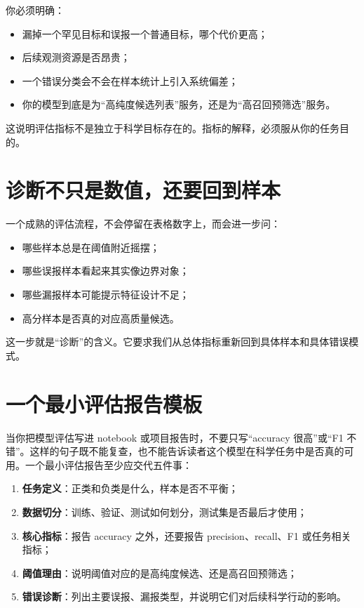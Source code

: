 你必须明确：

\begin{itemize}
    \item 漏掉一个罕见目标和误报一个普通目标，哪个代价更高；
    \item 后续观测资源是否昂贵；
    \item 一个错误分类会不会在样本统计上引入系统偏差；
    \item 你的模型到底是为“高纯度候选列表”服务，还是为“高召回预筛选”服务。
\end{itemize}

这说明评估指标不是独立于科学目标存在的。指标的解释，必须服从你的任务目的。

\section{诊断不只是数值，还要回到样本}

一个成熟的评估流程，不会停留在表格数字上，而会进一步问：

\begin{itemize}
    \item 哪些样本总是在阈值附近摇摆；
    \item 哪些误报样本看起来其实像边界对象；
    \item 哪些漏报样本可能提示特征设计不足；
    \item 高分样本是否真的对应高质量候选。
\end{itemize}

这一步就是“诊断”的含义。它要求我们从总体指标重新回到具体样本和具体错误模式。

\section{一个最小评估报告模板}

当你把模型评估写进 notebook 或项目报告时，不要只写“accuracy 很高”或“F1 不错”。这样的句子既不能复查，也不能告诉读者这个模型在科学任务中是否真的可用。一个最小评估报告至少应交代五件事：

\begin{enumerate}
    \item \textbf{任务定义}：正类和负类是什么，样本是否不平衡；
    \item \textbf{数据切分}：训练、验证、测试如何划分，测试集是否最后才使用；
    \item \textbf{核心指标}：报告 accuracy 之外，还要报告 precision、recall、F1 或任务相关指标；
    \item \textbf{阈值理由}：说明阈值对应的是高纯度候选、还是高召回预筛选；
    \item \textbf{错误诊断}：列出主要误报、漏报类型，并说明它们对后续科学行动的影响。
\end{enumerate}

